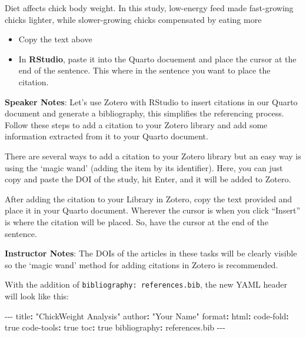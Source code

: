 \documentclass[
  letterpaper,
  DIV=11,
  numbers=noendperiod]{scrartcl}
\newenvironment{Shaded}{\begin{snugshade}}{\end{snugshade}}
\newcommand{\AttributeTok}[1]{\textcolor[rgb]{0.40,0.45,0.13}{#1}}
\newcommand{\CharTok}[1]{\textcolor[rgb]{0.13,0.47,0.30}{#1}}
\newcommand{\FunctionTok}[1]{\textcolor[rgb]{0.28,0.35,0.67}{#1}}
\newcommand{\KeywordTok}[1]{\textcolor[rgb]{0.00,0.23,0.31}{\textbf{#1}}}
\newcommand{\NormalTok}[1]{\textcolor[rgb]{0.00,0.23,0.31}{#1}}
\newcommand{\PreprocessorTok}[1]{\textcolor[rgb]{0.68,0.00,0.00}{#1}}
\newcommand{\StringTok}[1]{\textcolor[rgb]{0.13,0.47,0.30}{#1}}
\providecommand{\tightlist}{%
  \setlength{\itemsep}{0pt}\setlength{\parskip}{0pt}}
\begin{document}
\begin{Shaded}
\begin{Highlighting}[]
\NormalTok{Diet affects chick body weight. In this study, low{-}energy feed made fast{-}growing chicks lighter, while slower{-}growing chicks compensated by eating more }
\end{Highlighting}
\end{Shaded}

\begin{itemize}
\tightlist
\item[$\square$]
  Copy the text above
\item[$\square$]
  In \textbf{RStudio}, paste it into the Quarto docuement and place the
  cursor at the end of the sentence. This where in the sentence you want
  to place the citation.
\end{itemize}

\textbf{Speaker Notes}: Let's use Zotero with RStudio to insert
citations in our Quarto document and generate a bibliography, this
simplifies the referencing process. Follow these steps to add a citation
to your Zotero library and add some information extracted from it to
your Quarto document.

There are several ways to add a citation to your Zotero library but an
easy way is using the `magic wand' (adding the item by its identifier).
Here, you can just copy and paste the DOI of the study, hit Enter, and
it will be added to Zotero.

After adding the citation to your Library in Zotero, copy the text
provided and place it in your Quarto document. Wherever the cursor is
when you click ``Insert'' is where the citation will be placed. So, have
the cursor at the end of the sentence.

\textbf{Instructor Notes}: The DOIs of the articles in these tasks will
be clearly visible so the `magic wand' method for adding citations in
Zotero is recommended.

With the addition of \texttt{bibliography:\ references.bib}, the new
YAML header will look like this:

\begin{Shaded}
\begin{Highlighting}[]
\PreprocessorTok{{-}{-}{-}}
\FunctionTok{title}\KeywordTok{:}\AttributeTok{ }\StringTok{"ChickWeight Analysis"}
\FunctionTok{author}\KeywordTok{:}\AttributeTok{ }\StringTok{"Your Name"}
\FunctionTok{format}\KeywordTok{:}
\AttributeTok{  }\FunctionTok{html}\KeywordTok{:}
\AttributeTok{    }\FunctionTok{code{-}fold}\KeywordTok{:}\AttributeTok{ }\CharTok{true}
\AttributeTok{    }\FunctionTok{code{-}tools}\KeywordTok{:}\AttributeTok{ }\CharTok{true}
\AttributeTok{    }\FunctionTok{toc}\KeywordTok{:}\AttributeTok{ }\CharTok{true}
\FunctionTok{bibliography}\KeywordTok{:}\AttributeTok{ references.bib}
\PreprocessorTok{{-}{-}{-}}
\end{Highlighting}
\end{Shaded}
\end{document}
